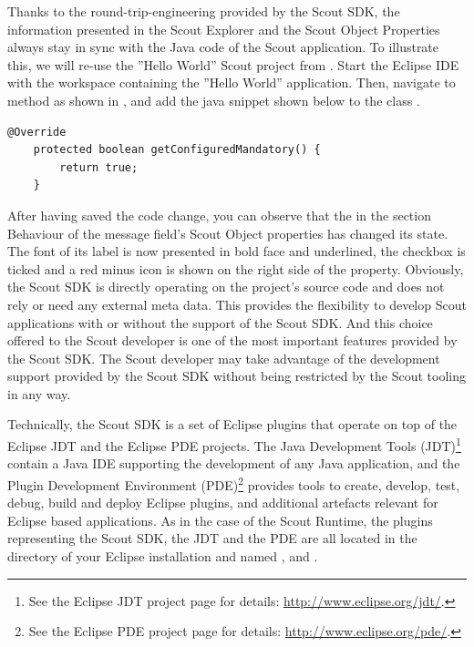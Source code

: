 \documentclass[a4paper,10pt,twoside]{book}
\begin{document}
Thanks to the round-trip-engineering provided by the Scout SDK, the information presented in the Scout Explorer and the Scout Object Properties always stay in sync with the Java code of the Scout application.
To illustrate this, we will re-use the ''Hello World'' Scout project from . 
Start the Eclipse IDE with the workspace containing the ''Hello World'' application.
Then, navigate to method  as shown in , and add the java snippet shown below to the class . 

\begin{lstlisting}[backgroundcolor=\color{white}]
    @Override
    protected boolean getConfiguredMandatory() {
        return true;
    }
\end{lstlisting}

After having saved the code change, you can observe that the  in the section Behaviour of the message field's Scout Object properties has changed its state. 
The font of its label is now presented in bold face and underlined, the checkbox is ticked and a red minus icon is shown on the right side of the property. 
Obviously, the Scout SDK is directly operating on the project's source code and does not rely or need any external meta data. 
This provides the flexibility to develop Scout applications with or without the support of the Scout SDK. 
And this choice offered to the Scout developer is one of the most important features provided by the Scout SDK. 
The Scout developer may take advantage of the development support provided by the Scout SDK without being restricted by the Scout tooling in any way.

Technically, the Scout SDK is a set of Eclipse plugins that operate on top of the Eclipse JDT and the Eclipse PDE projects.
The Java Development Tools (JDT)\footnote{
See the Eclipse JDT project page for details: \url{http://www.eclipse.org/jdt/}.
} 
contain a Java IDE supporting the development of any Java application, 
and the Plugin Development Environment (PDE)\footnote{
See the Eclipse PDE project page for details: \url{http://www.eclipse.org/pde/}.
}
provides tools to create, develop, test, debug, build and deploy Eclipse plugins, and additional artefacts relevant for Eclipse based applications. 
As in the case of the Scout Runtime, the plugins representing the Scout SDK, the JDT and the PDE are all located in the  directory of your Eclipse installation and named ,  and  . 
\end{document}
